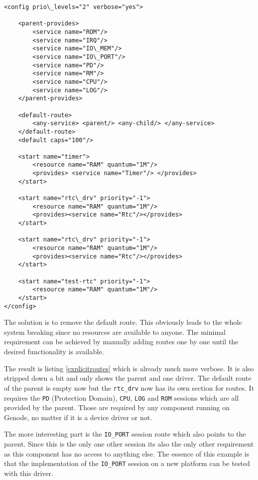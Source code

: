 \documentclass[
a4paper,
12pt,
notitlepage,
parskip=half,
DIV=11,
]{scrbook}
\begin{document}
		\begin{lstlisting}
<config prio\_levels="2" verbose="yes">
		
	<parent-provides>
		<service name="ROM"/>
		<service name="IRQ"/>
		<service name="IO\_MEM"/>
		<service name="IO\_PORT"/>
		<service name="PD"/>
		<service name="RM"/>
		<service name="CPU"/>
		<service name="LOG"/>
	</parent-provides>
		
	<default-route>
		<any-service> <parent/> <any-child/> </any-service>
	</default-route>
	<default caps="100"/>
		
	<start name="timer">
		<resource name="RAM" quantum="1M"/>
		<provides> <service name="Timer"/> </provides>
	</start>
		
	<start name="rtc\_drv" priority="-1">
		<resource name="RAM" quantum="1M"/>
		<provides><service name="Rtc"/></provides>
	</start>
		
	<start name="rtc\_drv" priority="-1">
		<resource name="RAM" quantum="1M"/>
		<provides><service name="Rtc"/></provides>
	</start>
		
	<start name="test-rtc" priority="-1">
		<resource name="RAM" quantum="1M"/>
	</start>
</config>
		\end{lstlisting}
		
		The solution is to remove the default route.
		This obviously leads to the whole system breaking since no resources are available to anyone.
		The minimal requirement can be achieved by manually adding routes one by one until the desired functionality is available.
		
		The result is listing \ref{explicitroutes} which is already much more verbose.
		It is also stripped down a bit and only shows the parent and one driver.
		The default route of the parent is empty now but the \texttt{rtc\_drv} now has its own section for routes.
		It requires the \texttt{PD} (Protection Domain), \texttt{CPU}, \texttt{LOG} and \texttt{ROM} sessions which are all provided by the parent.
		Those are required by any component running on Genode, no matter if it is a device driver or not.
		
		The more interesting part is the \texttt{IO\_PORT} session route which also points to the parent.
		Since this is the only one other session its also the only other requirement as this component has no access to anything else.
		The essence of this example is that the implementation of the \texttt{IO\_PORT} session on a new platform can be tested with this driver.
\end{document}
